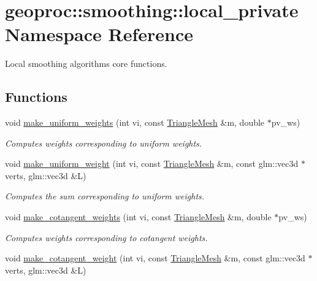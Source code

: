\hypertarget{namespacegeoproc_1_1smoothing_1_1local__private}{}\section{geoproc\+:\+:smoothing\+:\+:local\+\_\+private Namespace Reference}
\label{namespacegeoproc_1_1smoothing_1_1local__private}


Local smoothing algorithms core functions.  


\subsection*{Functions}
\begin{DoxyCompactItemize}
\item 
void \hyperlink{namespacegeoproc_1_1smoothing_1_1local__private_a04fc2ea113fcafa38210c562dca3d735}{make\+\_\+uniform\+\_\+weights} (int vi, const \hyperlink{classgeoproc_1_1TriangleMesh}{Triangle\+Mesh} \&m, double $\ast$pv\+\_\+ws)
\begin{DoxyCompactList}\small\item\em Computes weights corresponding to uniform weights. \end{DoxyCompactList}\item 
void \hyperlink{namespacegeoproc_1_1smoothing_1_1local__private_a8be790d814ab013aaf5d4e1c48af0ed7}{make\+\_\+uniform\+\_\+weight} (int vi, const \hyperlink{classgeoproc_1_1TriangleMesh}{Triangle\+Mesh} \&m, const glm\+::vec3d $\ast$verts, glm\+::vec3d \&L)
\begin{DoxyCompactList}\small\item\em Computes the sum corresponding to uniform weights. \end{DoxyCompactList}\item 
void \hyperlink{namespacegeoproc_1_1smoothing_1_1local__private_a258b6f254a89ea6773e6b59cbe16e4f5}{make\+\_\+cotangent\+\_\+weights} (int vi, const \hyperlink{classgeoproc_1_1TriangleMesh}{Triangle\+Mesh} \&m, double $\ast$pv\+\_\+ws)
\begin{DoxyCompactList}\small\item\em Computes weights corresponding to cotangent weights. \end{DoxyCompactList}\item 
void \hyperlink{namespacegeoproc_1_1smoothing_1_1local__private_ad5c1b8a2f5202da2837c7c5bcb03beff}{make\+\_\+cotangent\+\_\+weight} (int vi, const \hyperlink{classgeoproc_1_1TriangleMesh}{Triangle\+Mesh} \&m, const glm\+::vec3d $\ast$verts, glm\+::vec3d \&L)

\end{DoxyCompactItemize}

